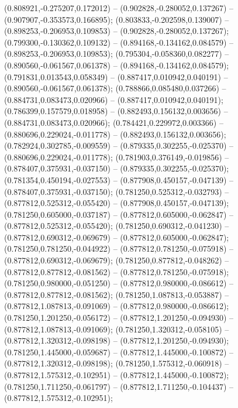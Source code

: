  (0.808921,-0.275207,0.172012) -- (0.902828,-0.280052,0.137267) -- (0.907907,-0.353573,0.166895);
 (0.803833,-0.202598,0.139007) -- (0.898253,-0.206953,0.109853) -- (0.902828,-0.280052,0.137267);
 (0.799300,-0.130362,0.109132) -- (0.894168,-0.134162,0.084579) -- (0.898253,-0.206953,0.109853);
 (0.795304,-0.058360,0.082277) -- (0.890560,-0.061567,0.061378) -- (0.894168,-0.134162,0.084579);
 (0.791831,0.013543,0.058349) -- (0.887417,0.010942,0.040191) -- (0.890560,-0.061567,0.061378);
 (0.788866,0.085480,0.037266) -- (0.884731,0.083473,0.020966) -- (0.887417,0.010942,0.040191);
 (0.786399,0.157579,0.018958) -- (0.882493,0.156132,0.003656) -- (0.884731,0.083473,0.020966);
 (0.784421,0.229972,0.003366) -- (0.880696,0.229024,-0.011778) -- (0.882493,0.156132,0.003656);
 (0.782924,0.302785,-0.009559) -- (0.879335,0.302255,-0.025370) -- (0.880696,0.229024,-0.011778);
 (0.781903,0.376149,-0.019856) -- (0.878407,0.375931,-0.037150) -- (0.879335,0.302255,-0.025370);
 (0.781354,0.450194,-0.027553) -- (0.877908,0.450157,-0.047139) -- (0.878407,0.375931,-0.037150);
 (0.781250,0.525312,-0.032793) -- (0.877812,0.525312,-0.055420) -- (0.877908,0.450157,-0.047139);
 (0.781250,0.605000,-0.037187) -- (0.877812,0.605000,-0.062847) -- (0.877812,0.525312,-0.055420);
 (0.781250,0.690312,-0.041230) -- (0.877812,0.690312,-0.069679) -- (0.877812,0.605000,-0.062847);
 (0.781250,0.781250,-0.044922) -- (0.877812,0.781250,-0.075918) -- (0.877812,0.690312,-0.069679);
 (0.781250,0.877812,-0.048262) -- (0.877812,0.877812,-0.081562) -- (0.877812,0.781250,-0.075918);
 (0.781250,0.980000,-0.051250) -- (0.877812,0.980000,-0.086612) -- (0.877812,0.877812,-0.081562);
 (0.781250,1.087813,-0.053887) -- (0.877812,1.087813,-0.091069) -- (0.877812,0.980000,-0.086612);
 (0.781250,1.201250,-0.056172) -- (0.877812,1.201250,-0.094930) -- (0.877812,1.087813,-0.091069);
 (0.781250,1.320312,-0.058105) -- (0.877812,1.320312,-0.098198) -- (0.877812,1.201250,-0.094930);
 (0.781250,1.445000,-0.059687) -- (0.877812,1.445000,-0.100872) -- (0.877812,1.320312,-0.098198);
 (0.781250,1.575312,-0.060918) -- (0.877812,1.575312,-0.102951) -- (0.877812,1.445000,-0.100872);
 (0.781250,1.711250,-0.061797) -- (0.877812,1.711250,-0.104437) -- (0.877812,1.575312,-0.102951);
